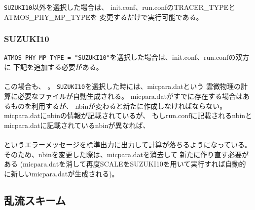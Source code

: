 \verb|SUZUKI10|以外を選択した場合は、
init.conf、run.confのTRACER\_TYPEとATMOS\_PHY\_MP\_TYPEを
変更するだけで実行可能である。


\subsubsection{SUZUKI10}
\verb|ATMOS_PHY_MP_TYPE = "SUZUKI10"|を選択した場合は、init.conf、run.confの双方に
下記を追加する必要がある。\\

\\

この場合も、
{\color{red}{init.confとrun.confに記載される\verb|PARAM_BIN|は同一にする必要がある}}。
\verb|SUZUKI10|を選択した時には、micpara.datという
雲微物理の計算に必要なファイルが自動生成される。
micpara.datがすでに存在する場合はあるものを利用するが、
nbinが変わると新たに作成しなければならない。
micpara.datにnbinの情報が記載されているが、
もしrun.confに記載されるnbinと
micpara.datに記載されているnbinが異なれば、\\

\\

\noindent というエラーメッセージを標準出力に出力して計算が落ちるようになっている。
そのため、nbinを変更した際は、micpara.datを消去して
新たに作り直す必要がある
(micpara.datを消して再度SCALEをSUZUKI10を用いて実行すれば自動的に新しいmicpara.datが生成される)。



\subsection{乱流スキーム} \label{sec:basic_turbulence}

